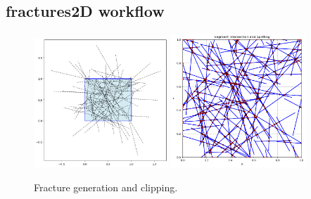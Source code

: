 \documentclass{article}
\begin{document}
\FloatBarrier  %
\subsection{fractures2D workflow}
\begin{figure}[htbp!]
    \centering
    \includegraphics[width=0.45\textwidth]{images/fractures2D/fractureGeneration.png}
    \hspace{0.05\textwidth}
    \includegraphics[width=0.45\textwidth]{images/fractures2D/fractureClipping.png}
    \caption{Fracture generation and clipping.}
    \label{fig:FracGen}
\end{figure}
\end{document}
